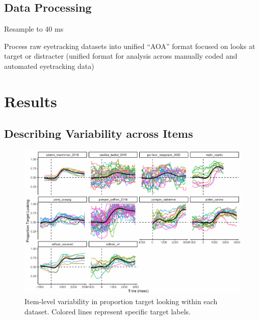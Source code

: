 \documentclass[10pt, letterpaper]{article}
\newenvironment{CodeChunk}{}{}
\begin{document}
\hypertarget{data-processing}{%
\subsection{Data Processing}\label{data-processing}}

Resample to 40 ms

Process raw eyetracking datasets into unified ``AOA'' format focused on
looks at target or distracter (unified format for analysis across
manually coded and automated eyetracking data)

\hypertarget{results}{%
\section{Results}\label{results}}

\hypertarget{describing-variability-across-items}{%
\subsection{Describing Variability across
Items}\label{describing-variability-across-items}}

\begin{CodeChunk}
\begin{figure}[h]

{\centering \includegraphics{figs/peekbank_item_vis-1} 

}

\caption[Item-level variability in proportion target looking within each dataset]{Item-level variability in proportion target looking within each dataset. Colored lines represent specific target labels.}\label{fig:peekbank_item_vis}
\end{figure}
\end{CodeChunk}
\end{document}
